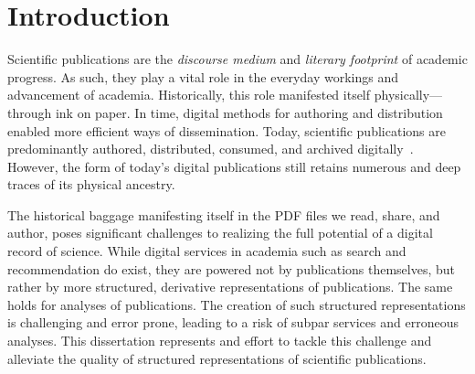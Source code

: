 \chapter{Introduction}
\label{chp:introduction}


Scientific publications are the \emph{discourse medium} and \emph{literary footprint} of academic progress. As such, they play a vital role in the everyday workings and advancement of academia.
Historically, this role manifested itself physically---through ink on paper. In time, digital methods for authoring %
and distribution enabled more efficient ways of dissemination.
Today, scientific publications are predominantly authored, distributed, consumed, and archived digitally~\cite{Lamers2018}. However, the form of today's digital publications still retains numerous and deep traces of its physical ancestry.




The historical baggage manifesting itself in the PDF files we read, share, and author, poses significant challenges to realizing the full potential of a digital record of science. While digital services in academia such as search and recommendation do exist, they are powered not by publications themselves, but rather by more structured, derivative representations of publications. The same holds for analyses of publications. The creation of such structured representations %
is challenging and error prone, leading to a risk of subpar services and erroneous analyses. This dissertation represents and effort to tackle this challenge and alleviate the quality of structured representations of scientific publications.

